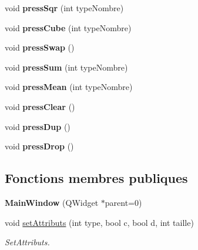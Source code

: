 \begin{DoxyCompactItemize}
\item 
\hypertarget{class_main_window_ad61a8b8a78c92453da2b55e4292e9d8c}{void {\bfseries press\-Sqr} (int type\-Nombre)}\label{class_main_window_ad61a8b8a78c92453da2b55e4292e9d8c}

\item 
\hypertarget{class_main_window_a3646c31c87248b33064cc83ad3b50f3c}{void {\bfseries press\-Cube} (int type\-Nombre)}\label{class_main_window_a3646c31c87248b33064cc83ad3b50f3c}

\item 
\hypertarget{class_main_window_a90f55dff8cd88ebb9ca51fbb45ff9572}{void {\bfseries press\-Swap} ()}\label{class_main_window_a90f55dff8cd88ebb9ca51fbb45ff9572}

\item 
\hypertarget{class_main_window_aad6db4cd90be3080ccfba45126f8314d}{void {\bfseries press\-Sum} (int type\-Nombre)}\label{class_main_window_aad6db4cd90be3080ccfba45126f8314d}

\item 
\hypertarget{class_main_window_af9af72599ae1edd0786d53b33548c02e}{void {\bfseries press\-Mean} (int type\-Nombre)}\label{class_main_window_af9af72599ae1edd0786d53b33548c02e}

\item 
\hypertarget{class_main_window_a7bfe416d75e010b19a746534be888500}{void {\bfseries press\-Clear} ()}\label{class_main_window_a7bfe416d75e010b19a746534be888500}

\item 
\hypertarget{class_main_window_a85c203aa98a11bff2fc1c04850c487f5}{void {\bfseries press\-Dup} ()}\label{class_main_window_a85c203aa98a11bff2fc1c04850c487f5}

\item 
\hypertarget{class_main_window_a7bf431a5544caa9134f78acaf4f5be96}{void {\bfseries press\-Drop} ()}\label{class_main_window_a7bf431a5544caa9134f78acaf4f5be96}

\end{DoxyCompactItemize}
\subsection*{Fonctions membres publiques}
\begin{DoxyCompactItemize}
\item 
\hypertarget{class_main_window_a8b244be8b7b7db1b08de2a2acb9409db}{{\bfseries Main\-Window} (Q\-Widget $\ast$parent=0)}\label{class_main_window_a8b244be8b7b7db1b08de2a2acb9409db}

\item 
void \hyperlink{class_main_window_a3104e49937a37d38118be822d75bdb41}{set\-Attributs} (int type, bool c, bool d, int taille)
\begin{DoxyCompactList}\small\item\em Set\-Attributs. \end{DoxyCompactList}\end{DoxyCompactItemize}


